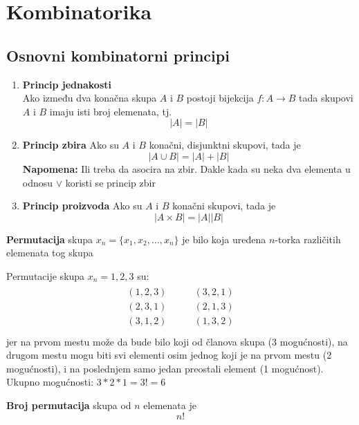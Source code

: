 \section{Kombinatorika}
\subsection{Osnovni kombinatorni principi}
\begin{enumerate}[label=\textbf{\arabic*.)}]
	\item \textbf{Princip jednakosti}\\
		Ako između dva konačna skupa $A$ i $B$ postoji bijekcija $f:A\to B$ tada skupovi $A$ i $B$ imaju isti broj elemenata, tj. $$|A|=|B|$$
	\item \textbf{Princip zbira}
		Ako su $A$ i $B$ konačni, disjunktni skupovi, tada je $$|A\cup B|=|A|+|B|$$
		\textbf{Napomena:} Ili treba da asocira na zbir. Dakle kada su neka dva elementa u odnosu $\lor$ koristi se princip zbir
	\item \textbf{Princip proizvoda}
		Ako su $A$ i $B$ konačni skupovi, tada je $$|A\times B|=|A||B|$$
\end{enumerate}

\begin{definition}
	\textbf{Permutacija} skupa $x_n = \{x_1, x_2, \ldots, x_n\}$ je bilo koja uređena $n$-torka različitih elemenata tog skupa
\end{definition}
\begin{example}
	Permutacije skupa $x_n = {1, 2, 3}$ su:
	\begin{align*}
		\begin{aligned}
		(1,2,3)\\
		(2,3,1)\\
		(3,1,2)\\
		\end{aligned}
		\quad \quad
		\begin{aligned}
		(3,2,1)\\
		(2,1,3)\\
		(1,3,2)\\
		\end{aligned}
	\end{align*}
	jer na prvom mestu može da bude bilo koji od članova skupa (3 mogućnosti), na drugom mestu mogu biti svi elementi osim jednog koji je na prvom mestu (2 mogućnosti), i na poslednjem samo jedan preostali element (1 mogućnost).\\
	Ukupno mogućnosti: $3*2*1=3!=6$	
\end{example}
\begin{theorem}
	\textbf{Broj permutacija} skupa od $n$ elemenata je $$n!$$
\end{theorem}

